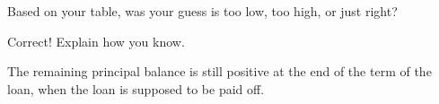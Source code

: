 \documentclass[handout,space,nooutcomes]{ximera}
\begin{document}
\begin{question}
Based on your table, was your guess is too low, too high, or just
right?  
\begin{multipleChoice}
\end{multipleChoice}
\vfill
\begin{question}
Correct!  Explain how you know. 
 \begin{freeResponse}
 
\end{freeResponse}
\begin{hint}
The remaining principal balance is still positive at the end of the term of the loan, when the loan is supposed to be paid off.  
\end{hint}
\end{question}
\end{question}
%
%
\end{document}
